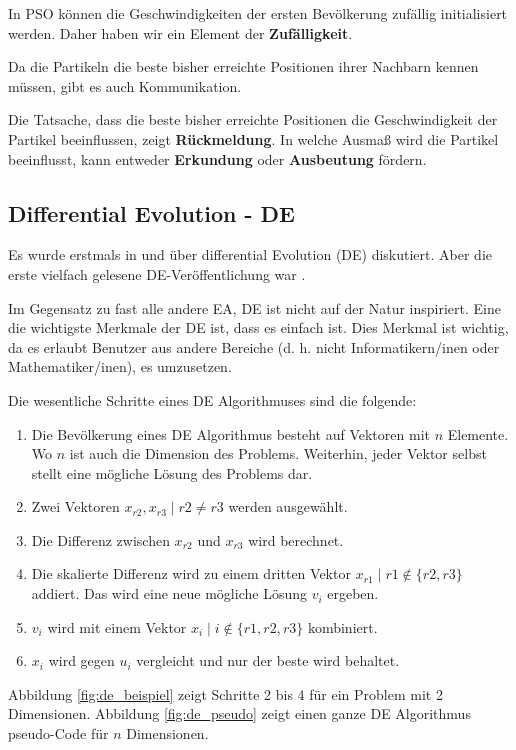 \documentclass[twoside,twocolumn]{article}
\begin{document}
In PSO können die Geschwindigkeiten der ersten Bevölkerung zufällig initialisiert werden. Daher haben wir ein Element der \textbf{Zufälligkeit}.\par
Da die Partikeln die beste bisher erreichte Positionen ihrer Nachbarn kennen müssen, gibt es auch Kommunikation.\par
Die Tatsache, dass die beste bisher erreichte Positionen die Geschwindigkeit der Partikel beeinflussen, zeigt \textbf{Rückmeldung}. In welche Ausmaß wird die Partikel beeinflusst, kann entweder \textbf{Erkundung} oder \textbf{Ausbeutung} fördern.

\subsection{Differential Evolution - DE}
Es wurde erstmals in \cite{storn_de_a} und \cite{storn_de_b} über differential Evolution (DE) diskutiert. Aber die erste vielfach gelesene DE-Veröffentlichung war \cite{price_storn_de}.\par
Im Gegensatz zu fast alle andere EA, DE ist nicht auf der Natur inspiriert. Eine die wichtigste Merkmale der DE ist, dass es einfach ist. Dies Merkmal ist wichtig, da es erlaubt Benutzer aus andere Bereiche (d. h. nicht Informatikern/inen oder Mathematiker/inen), es umzusetzen.\par
Die wesentliche Schritte eines DE Algorithmuses sind die folgende:

\begin{enumerate}
\item Die Bevölkerung eines DE Algorithmus besteht auf Vektoren mit $n$ Elemente. Wo $n$ ist auch die Dimension des Problems. Weiterhin, jeder Vektor selbst stellt eine mögliche Lösung des Problems dar.
\item Zwei Vektoren $x_{r2}, x_{r3} \mid r2 \neq r3$ werden ausgewählt.
\item Die Differenz zwischen $x_{r2}$ und $x_{r3}$ wird berechnet.
\item Die skalierte Differenz wird zu einem dritten Vektor $x_{r1} \mid r1 \notin \{ r2, r3 \}$ addiert. Das wird eine neue mögliche Lösung $v_i$ ergeben.
\item $v_i$ wird mit einem Vektor $x_i \mid i \notin \{ r1, r2, r3 \}$ kombiniert.
\item $x_i$ wird gegen $u_i$ vergleicht und nur der beste wird behaltet.
\end{enumerate}

Abbildung \ref{fig:de_beispiel} zeigt Schritte 2 bis 4 für ein Problem mit 2 Dimensionen. Abbildung \ref{fig:de_pseudo} zeigt einen ganze DE Algorithmus pseudo-Code für $n$ Dimensionen.\par
\end{document}
